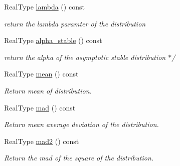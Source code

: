 \begin{DoxyCompactItemize}
\mbox{\label{structexponential__distribution_a7fcde2f1a6cd1aee2c13300df3663a2f}} 
Real\+Type \mbox{\hyperlink{structexponential__distribution_a7fcde2f1a6cd1aee2c13300df3663a2f}{lambda}} () const
\begin{DoxyCompactList}\small\item\em return the lambda paramter of the distribution \end{DoxyCompactList}\item 
\mbox{\label{structexponential__distribution_a33770c28a6a1d0ab2ffe2bc288cec696}} 
Real\+Type \mbox{\hyperlink{structexponential__distribution_a33770c28a6a1d0ab2ffe2bc288cec696}{alpha\+\_\+stable}} () const
\begin{DoxyCompactList}\small\item\em return the alpha of the asymptotic stable distribution $\ast$/ \end{DoxyCompactList}\item 
\mbox{\label{structexponential__distribution_a3ee0b29c9dd16928c1b53321b361e9fd}} 
Real\+Type \mbox{\hyperlink{structexponential__distribution_a3ee0b29c9dd16928c1b53321b361e9fd}{mean}} () const
\begin{DoxyCompactList}\small\item\em Return mean of distribution. \end{DoxyCompactList}\item 
\mbox{\label{structexponential__distribution_a66bcbe0d4b5ddc9c8b1d1a04ddfbcb6d}} 
Real\+Type \mbox{\hyperlink{structexponential__distribution_a66bcbe0d4b5ddc9c8b1d1a04ddfbcb6d}{mad}} () const
\begin{DoxyCompactList}\small\item\em Return mean average deviation of the distribution. \end{DoxyCompactList}\item 
\mbox{\label{structexponential__distribution_a8e7d3d592e34ea909a7b0c8bb4807b66}} 
Real\+Type \mbox{\hyperlink{structexponential__distribution_a8e7d3d592e34ea909a7b0c8bb4807b66}{mad2}} () const
\begin{DoxyCompactList}\small\item\em Return the mad of the square of the distribution. \end{DoxyCompactList}\item 

\end{DoxyCompactItemize}
